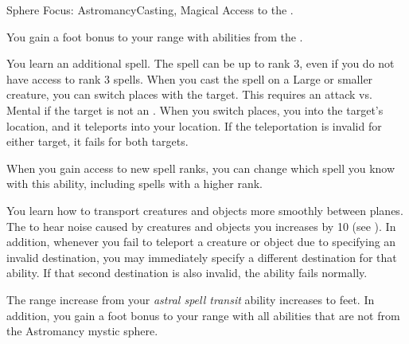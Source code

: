   \begin{magicalfeat}{Sphere Focus: Astromancy}{Casting, Magical}
    \featpre Access to the  .

     You gain a  foot bonus to your range with abilities from the  .

     You learn an additional  spell.
    The spell can be up to rank 3, even if you do not have access to rank 3 spells.
    When you cast the spell on a Large or smaller creature, you can switch places with the target.
    This requires an attack vs. Mental if the target is not an .
    When you switch places, you  into the target's location, and it teleports into your location.
    If the teleportation is invalid for either target, it fails for both targets.

    When you gain access to new spell ranks, you can change which spell you know with this ability, including spells with a higher rank.

     You learn how to transport creatures and objects more smoothly between planes.
    The  to hear noise caused by creatures and objects you  increases by 10 (see ).
    In addition, whenever you fail to teleport a creature or object due to specifying an invalid destination, you may immediately specify a different destination for that ability.
    If that second destination is also invalid, the ability fails normally.

     The range increase from your \textit{astral spell transit} ability increases to  feet.
    In addition, you gain a  foot bonus to your range with all \magical abilities that are not from the Astromancy mystic sphere.
  \end{magicalfeat}

